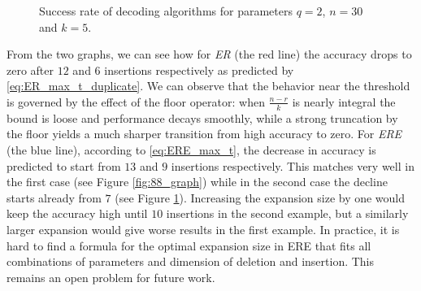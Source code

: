 \documentclass{article}
\begin{document}
\begin{figure}[H]
\caption{
Success rate of decoding algorithms for parameters $q=2$, $n=30$ and $k=5$.
}
\label{fig:65_graph}
\end{figure}


From the two graphs, we can see how for \textit{ER} (the red line) the accuracy drops to zero after $12$ and $6$ insertions respectively as predicted by \eqref{eq:ER_max_t_duplicate}.
We can observe that the behavior near the threshold is governed by the effect of the floor operator: when $\frac{n-r}{k}$ is nearly integral the bound is loose and performance decays smoothly, while a strong truncation by the floor yields a much sharper transition from high accuracy to zero.
For \textit{ERE} (the blue line), according to \eqref{eq:ERE_max_t}, the decrease in accuracy is predicted to start from $13$ and $9$ insertions respectively. This matches very well in the first case (see Figure \ref{fig:88_graph}) while in the second case the decline starts already from $7$ (see Figure \ref{fig:65_graph}). Increasing the expansion size by one would keep the accuracy high until $10$ insertions in the second example, but a similarly larger expansion would give worse results in the first example.
In practice, it is hard to find a formula for the optimal expansion size in ERE that fits all combinations of parameters and dimension of deletion and insertion. This remains an open problem for future work.
\end{document}

